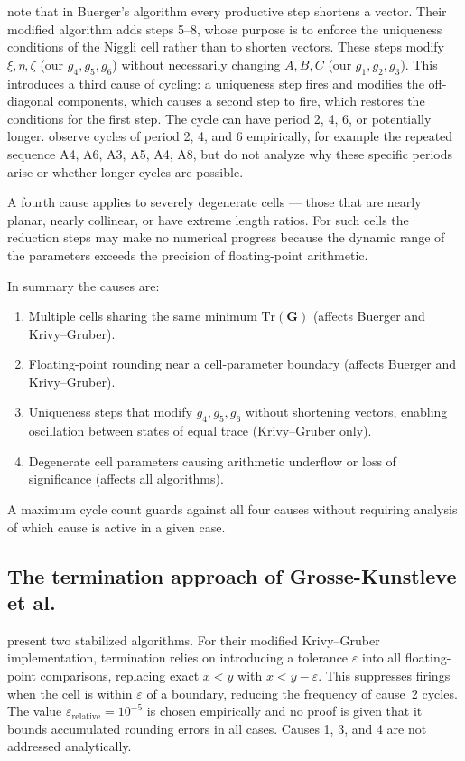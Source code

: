 \documentclass[preprint]{iucr}              %
\numberwithin{equation}{section}
\begin{document}
	 note that in Buerger's algorithm every
	productive step shortens a vector. Their modified algorithm adds
	steps 5--8, whose purpose is to enforce the uniqueness conditions
	of the Niggli cell rather than to shorten vectors. These steps
	modify $\xi, \eta, \zeta$ (our $g_4, g_5, g_6$) without necessarily
	changing $A, B, C$ (our $g_1, g_2, g_3$). This introduces a third
	cause of cycling: a uniqueness step fires and modifies the
	off-diagonal components, which causes a second step to fire, which
	restores the conditions for the first step. The cycle can have
	period 2, 4, 6, or potentially longer.
	 observe cycles of period 2, 4,
	and 6 empirically, for example the repeated sequence A4, A6, A3,
	A5, A4, A8, but do not analyze why these specific periods arise or
	whether longer cycles are possible.
	
	A fourth cause applies to severely degenerate cells --- those that
	are nearly planar, nearly collinear, or have extreme length ratios.
	For such cells the reduction steps may make no numerical progress
	because the dynamic range of the parameters exceeds the precision
	of floating-point arithmetic.
	
	In summary the causes are:
	\begin{enumerate}
		\item Multiple cells sharing the same minimum $\mathrm{Tr}(\mathbf{G})$
		(affects Buerger and Krivy--Gruber).
		\item Floating-point rounding near a cell-parameter boundary
		(affects Buerger and Krivy--Gruber).
		\item Uniqueness steps that modify $g_4, g_5, g_6$ without
		shortening vectors, enabling oscillation between states
		of equal trace (Krivy--Gruber only).
		\item Degenerate cell parameters causing arithmetic underflow
		or loss of significance (affects all algorithms).
	\end{enumerate}
	
	A maximum cycle count guards against all four causes without
	requiring analysis of which cause is active in a given case.
	
	\subsection{The termination approach of Grosse-Kunstleve et al.}
	
	 present two stabilized algorithms.
	For their modified Krivy--Gruber implementation, termination relies
	on introducing a tolerance $\varepsilon$ into all floating-point
	comparisons, replacing exact $x < y$ with $x < y - \varepsilon$.
	This suppresses firings when the cell is within $\varepsilon$ of a
	boundary, reducing the frequency of cause~2 cycles. The value
	$\varepsilon_\mathrm{relative} = 10^{-5}$ is chosen empirically
	and no proof is given that it bounds accumulated rounding errors in
	all cases. Causes 1, 3, and 4 are not addressed analytically.
	
\end{document}
